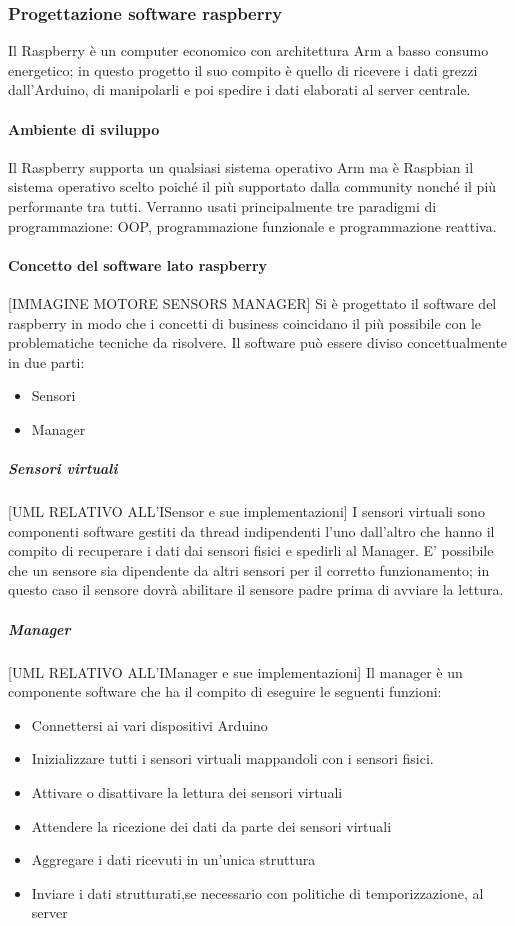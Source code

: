 \documentclass[12pt]{article}
\begin{document}
\subsubsection{Progettazione software raspberry}
Il Raspberry è un computer economico con architettura Arm a basso consumo energetico; in questo progetto il suo compito è quello di ricevere i dati grezzi dall'Arduino, di manipolarli e poi spedire i dati elaborati al server centrale.
\paragraph{Ambiente di sviluppo}
Il Raspberry supporta un qualsiasi sistema operativo Arm ma è Raspbian il sistema operativo scelto poiché il più supportato dalla community nonché il più performante tra tutti. Verranno usati principalmente tre paradigmi di programmazione: OOP, programmazione funzionale e programmazione reattiva. 
\paragraph{Concetto del software lato raspberry}
[IMMAGINE MOTORE SENSORS MANAGER]
Si è progettato il software del raspberry in modo che i concetti di business coincidano il più possibile con le problematiche tecniche da risolvere.
Il software può essere diviso concettualmente in due parti:
\begin{itemize}
\item Sensori
\item Manager
\end{itemize}
\subparagraph{Sensori virtuali}
[UML RELATIVO ALL'ISensor e sue implementazioni]
I sensori virtuali sono componenti software gestiti da thread indipendenti l'uno dall'altro che hanno il compito di recuperare i dati dai sensori fisici e spedirli al Manager.
E' possibile che un sensore sia dipendente da altri sensori per il corretto funzionamento; in questo caso il sensore dovrà abilitare il sensore padre prima di avviare la lettura.
\subparagraph{Manager}
[UML RELATIVO ALL'IManager e sue implementazioni]
Il manager è un componente software che ha il compito di eseguire le seguenti funzioni:
\begin{itemize}
\item Connettersi ai vari dispositivi Arduino
\item Inizializzare tutti i sensori virtuali mappandoli con i sensori fisici.
\item Attivare o disattivare la lettura dei sensori virtuali
\item Attendere la ricezione dei dati da parte dei sensori virtuali
\item Aggregare i dati ricevuti in un'unica struttura
\item Inviare i dati strutturati,se necessario con politiche di temporizzazione, al server
\end{itemize}
\end{document}
